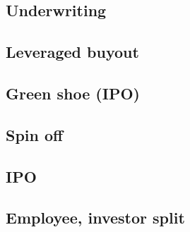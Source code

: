 
\subsection{Underwriting}

\subsection{Leveraged buyout}

\subsection{Green shoe (IPO)}

\subsection{Spin off}

\subsection{IPO}

\subsection{Employee, investor split}

